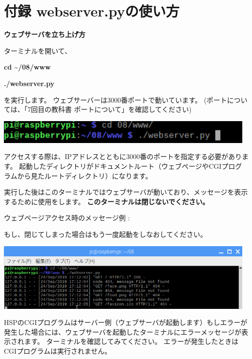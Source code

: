 \section{付録 webserver.pyの使い方}
{\bfseries
ウェブサーバを立ち上げ方}

ターミナルを開いて、

\textbf{cd {\textasciitilde}/08/www}

\textbf{./webserver.py}

を実行します。
ウェブサーバーは3000番ポートで動いています。
(ポートについては、「7回目の教科書
ポートについて」を確認してください)%


\begin{center}
\includegraphics[width=13cm]{./text08-img/textbook-img063.png}

\end{center}
アクセスする際は、IPアドレスとともに3000番のポートを指定する必要があります。
起動したディレクトリがドキュメントルート（ウェブページやCGIプログラムから見たルートディレクトリ）になります。


実行した後はこのターミナルではウェブサーバが動いており、メッセージを表示するために使用をします。
\textbf{このターミナルは閉じないでください。}

ウェブページアクセス時のメッセージ例
:

もし、閉じてしまった場合はもう一度起動をしなおしてください。

\begin{center}
\includegraphics[width=13cm]{./text08-img/textbook-img064.png}

\end{center}
HSPのCGIプログラムはサーバー側（ウェブサーバが起動します）もしエラーが発生した場合には、ウェブサーバを起動したターミナルにエラーメッセージが表示されます。
ターミナルを確認してみてください。
エラーが発生したときはCGIプログラムは実行されません。

